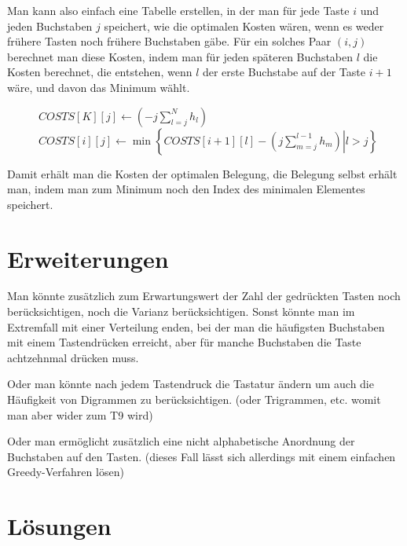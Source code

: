 \documentclass[11pt,a4paper]{article}
\begin{document}
Man kann also einfach eine Tabelle erstellen, in der man für jede Taste $i$ und jeden Buchstaben $j$ speichert, wie die optimalen Kosten  wären, wenn es weder frühere Tasten noch frühere Buchstaben gäbe. Für ein solches Paar $(i,j)$ berechnet man diese Kosten, indem man für jeden späteren Buchstaben $l$ die Kosten berechnet, die entstehen, wenn $l$ der erste Buchstabe auf der Taste $i+1$ wäre, und davon das Minimum wählt.

\begin{figure}[h]
\begin{algorithmic}[1]
\STATE $COSTS[K][j] \gets \left(- j\sum\limits_{l=j}^{N} h_l\right)$
\ENDFOR
{}
\STATE $COSTS[i][j] \gets \min\left\lbrace\left.COSTS[i+1][l] -  \left(j\sum\limits_{m=j}^{l-1} h_m\right)\right|l>j\right\rbrace$
\ENDFOR
\ENDFOR
\end{algorithmic}
\end{figure}

Damit erhält man die Kosten der optimalen Belegung, die Belegung selbst erhält man, indem man zum Minimum noch den Index des minimalen Elementes speichert.


\section{Erweiterungen}
Man könnte zusätzlich zum Erwartungswert der Zahl der gedrückten Tasten noch berücksichtigen, noch die Varianz berücksichtigen. Sonst könnte man im Extremfall mit einer Verteilung enden, bei der man die häufigsten Buchstaben mit einem Tastendrücken erreicht, aber für manche Buchstaben die Taste achtzehnmal drücken muss.

Oder man könnte nach jedem Tastendruck die Tastatur ändern um auch die Häufigkeit von Digrammen zu berücksichtigen. (oder Trigrammen, etc. womit man aber wider zum T9 wird)

Oder man ermöglicht zusätzlich eine nicht alphabetische Anordnung der Buchstaben auf den Tasten. (dieses Fall lässt sich allerdings mit einem einfachen Greedy-Verfahren lösen)


\section{Lösungen}
\newenvironment{lansol}[2]{\begin{minipage}{5cm}#1:#2 }{\end{minipage}}
\end{document}
